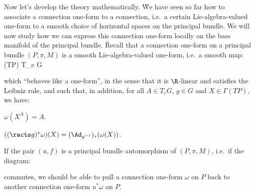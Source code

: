 Now let's develop the theory mathematically. \v

We have seen so far how to associate a connection one-form to a connection, i.e.\ a certain Lie-algebra-valued
one-form to a smooth choice of horizontal spaces on the principal bundle. We will now study how we can express this
connection one-form locally on the base manifold of the principal bundle. \v

Recall that a connection one-form on a principal bundle $(P,\pi,M)$ is a smooth Lie-algebra-valued one-form, i.e.\ a
smooth map:
\bse
\omega\cl \Gamma(TP) \xrightarrow{\sim} T_e G
\ese

which ``behaves like a one-form'', in the sense that it is $\R$-linear and satisfies the Leibniz rule, and such that,
in addition, for all $A\in T_e G$, $g\in G$ and $X\in \Gamma(TP)$, we have:
\ben[label=\roman*)]
\item $\omega(X^A)=A$.
\item $((\racts g)^*\omega)(X)=(\Ad_{g^{-1}})_*(\omega(X))$.
\een

If the pair $(u,f)$ is a principal bundle automorphism of $(P,\pi,M)$, i.e.\ if the diagram:

\vspace{10pt}

\bse
{}
\ese

\vspace{10pt}

commutes, we should be able to pull a connection one-form $\omega$ on $P$ back to another connection one-form
$u^*\omega$ on $P$.

\vspace{10pt}

\bse
{}
\ese

\vspace{10pt}

